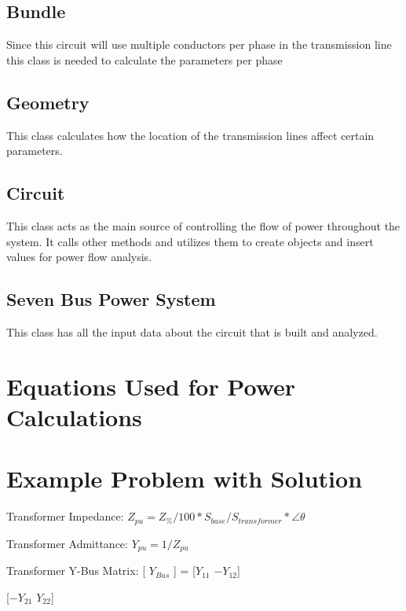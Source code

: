 \documentclass{article}
\begin{document}
	\subsection{Bundle}
	Since this circuit will use multiple conductors per phase in the transmission line this class is needed to calculate the parameters per phase
	
	\subsection{Geometry}
	This class calculates how the location of the transmission lines affect certain parameters.
	
	\subsection{Circuit}
	This class acts as the main source of controlling the flow of power throughout the system. It calls other methods and utilizes them to create objects and insert values for power flow analysis.
	
	\subsection{Seven Bus Power System}
	This class has all the input data about the circuit that is built and analyzed.
	
	\section{Equations Used for Power Calculations}
	
	\section{Example Problem with Solution}
	\noindent
	Transformer Impedance: $Z_{pu} = Z_\% / 100 * S_{base} / S_{transformer} * \angle{\theta}$
	
	\noindent
	Transformer Admittance: $Y_{pu} = 1 / Z_{pu}$
	
	\noindent
	Transformer Y-Bus Matrix: [ $Y_{Bus}$ ] = [$Y_{11}$ $-Y_{12}$]

	\hspace{141pt}[$-Y_{21}$ $Y_{22}$]	
\end{document}
